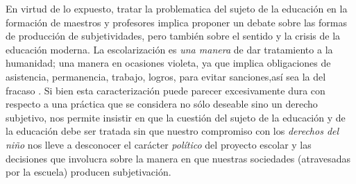\documentclass[a4paper,12pt,spanish]{book}
\begin{document}
  En virtud de lo expuesto, tratar la problematica del sujeto de la educación en la formación de maestros y profesores implica proponer un 
  debate sobre las formas de producción de subjetividades, pero también sobre el sentido y la crisis de la educación moderna. La 
  escolarización es \textit{una manera} de dar tratamiento a la humanidad; una manera en ocasiones violeta, ya que implica 
  obligaciones de asistencia, permanencia, trabajo, logros, para evitar sanciones,así sea la del fracaso \citep{baqueroyterigi1996}.
  Si bien esta caracterización puede parecer excesivamente dura con respecto a una práctica que se considera no sólo deseable sino un 
  derecho subjetivo, nos permite insistir en que la cuestión del sujeto de la educación y de la educación debe ser tratada sin que 
  nuestro compromiso con los \textit{derechos del niño} nos lleve a desconocer el carácter \textit{político} del proyecto escolar y 
  las decisiones que involucra sobre la manera en que nuestras sociedades (atravesadas por la escuela) producen subjetivación.

 

\end{document}
